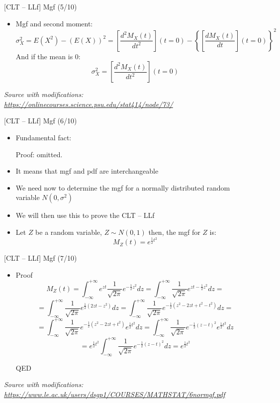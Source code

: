 \documentclass{beamer}
\begin{document}
\begin{frame}
{\centerline{[CLT -- LLf] Mgf (5/10)}}

\begin{itemize}
\item Mgf and second moment:
$$ \sigma_X^2 = E(X^2)-(E(X))^2 = \left [ \frac{d^2M_X(t)}{dt^2} \right ] (t=0) -  \left \{ \left [ \frac{dM_X(t)}{dt} \right ] (t=0) \right \}^2$$
And if the mean is 0:
$$ \sigma_X^2 =  \left [ \frac{d^2M_X(t)}{dt^2} \right ] (t=0) $$


\end{itemize}

\textit{\small
Source with modifications: \url{https://onlinecourses.science.psu.edu/stat414/node/73/}}
\end{frame}

\begin{frame}
{\centerline{[CLT -- LLf] Mgf (6/10)}}

\begin{itemize}
\item Fundamental fact:
\begin{center}
\end{center}
Proof: omitted.
\item It means that mgf and pdf are interchangeable
\item We need now to determine the mgf for a normally distributed random variable $N(0,\sigma^2)$
\item We will then use this to prove the CLT -- LLf
\item Let $Z$ be a random variable, $  Z \sim N(0,1) $ then, the mgf for $Z$ is:
$$M_Z(t) = e^{\frac{1}{2}t^2}$$
\end{itemize}

\end{frame}

\begin{frame}
{\centerline{[CLT -- LLf] Mgf (7/10)}}

\begin{itemize}
\item Proof
$$M_Z(t) = \int_{-\infty}^{+ \infty} e^{zt} \frac{1}{\sqrt{2\pi}}e^{-\frac{1}{2}z^2}dz = 
\int_{-\infty}^{+ \infty} \frac{1}{\sqrt{2\pi}} e^{zt-\frac{1}{2}z^2}dz =$$
$$ = \int_{-\infty}^{+ \infty} \frac{1}{\sqrt{2\pi}} e^{\frac{1}{2}(2zt-z^2)}dz = \int_{-\infty}^{+ \infty} \frac{1}{\sqrt{2\pi}} e^{-\frac{1}{2}(z^2 - 2zt +t^2 - t^2)}dz =$$
$$ = \int_{-\infty}^{+ \infty} \frac{1}{\sqrt{2\pi}} e^{-\frac{1}{2}(z^2 - 2zt +t^2 )}e^{\frac{1}{2}t^2}dz
= \int_{-\infty}^{+ \infty}\frac{1}{\sqrt{2\pi}} e^{-\frac{1}{2}(z - t )^2}e^{\frac{1}{2}t^2}dz$$
$$ =  e^{\frac{1}{2}t^2} \int_{-\infty}^{+ \infty}\frac{1}{\sqrt{2\pi}} e^{-\frac{1}{2}(z - t )^2}dz = e^{\frac{1}{2}t^2} $$

QED
\end{itemize}

\textit{\small
Source with modifications: \url{https://www.le.ac.uk/users/dsgp1/COURSES/MATHSTAT/6normgf.pdf}}
\end{frame}
\end{document}
